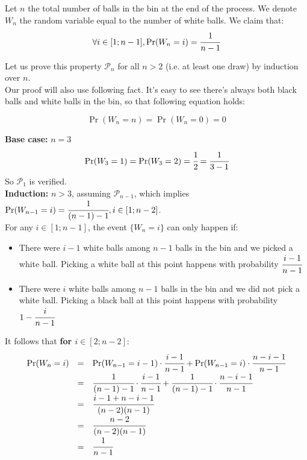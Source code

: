 \providecommand{\f}[2]{\ensuremath{\cfrac{#1}{#2}}}

Let $n$ the total number of balls in the bin at the end of the process. We denote $W_n$ the random variable equal to the number of white balls. We claim that:
\[
  \forall i \in [1; n-1], \Pr(W_n = i) = \f{1}{n - 1}
\]

Let us prove this property $\mathcal{P}_n$ for all $n > 2$ (i.e. at least one draw) by induction over $n$.\\

Our proof will also use following fact. It's easy to see there's always both black balls and white balls in the bin, so that following equation holds:

\[
  \Pr(W_n = n) = \Pr(W_n = 0) = 0
\]

\noindent
\textbf{Base case:} $n = 3$\\
\[
    \Pr(W_3 = 1) = \Pr(W_3 = 2) = \f{1}{2} = \f{1}{3 - 1}
\]
So $\mathcal{P}_1$ is verified.\\

\noindent
\textbf{Induction:} $n > 3$, assuming $\mathcal{P}_{n-1}$, which implies $\Pr(W_{n-1} = i) = \f{1}{(n - 1) - 1}, i \in [1;n - 2]$.\\
For any $i \in [1; n-1]$, the event $\{W_n = i\}$ can only happen if:
\begin{itemize}
  \item There were $i - 1$ white balls among $n - 1$ balls in the bin and we picked a white ball. Picking a white ball at this point happens with probability $\f{i - 1}{n - 1}$
  \item There were $i$ white balls among $n - 1$ balls in the bin and we did not pick a white ball. Picking a black ball at this point happens with probability $1 - \f{i}{n - 1}$
\end{itemize}

\noindent
It follows that \textbf{for $i \in [2; n - 2]$}:
\[\def\arraystretch{1.5}
  \begin{array}{lll}
    \Pr(W_n = i) & = & \Pr(W_{n-1} = i - 1) \cdot \f{i - 1}{n - 1} + \Pr(W_{n-1} = i) \cdot \f{n - i - 1}{n - 1} \\
                 & = & \f{1}{(n - 1) - 1} \cdot \f{i - 1}{n - 1} + \f{1}{(n - 1) - 1} \cdot \f{n - i - 1}{n - 1} \\
                 & = & \f{i - 1 + n - i - 1}{(n - 2)(n-1)} \\
                 & = & \f{n - 2}{(n - 2)(n-1)}\\
                 & = & \f{1}{n - 1}
  \end{array}
\]

